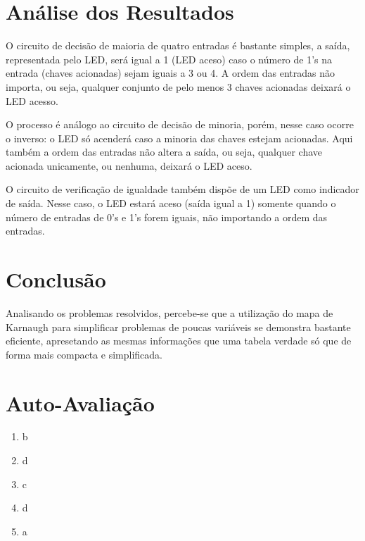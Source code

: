 \documentclass[12pt]{article}
\begin{document}
\section{Análise dos Resultados}
\label{sec:Resultados}

O circuito de decisão de maioria de quatro entradas é bastante simples, a saída, representada pelo LED, será igual a 1 (LED aceso) caso o número de 1's na entrada (chaves acionadas) sejam iguais a 3 ou 4. A ordem das entradas não importa, ou seja, qualquer conjunto de pelo menos 3 chaves acionadas deixará o LED acesso.

O processo é análogo ao circuito de decisão de minoria, porém, nesse caso ocorre o inverso: o LED só acenderá caso a minoria das chaves estejam acionadas. Aqui também a ordem das entradas não altera a saída, ou seja, qualquer chave acionada unicamente, ou nenhuma, deixará o LED aceso.

O circuito de verificação de igualdade também dispõe de um LED como indicador de saída. Nesse caso, o LED estará aceso (saída igual a 1) somente quando o número de entradas de 0's e 1's forem iguais, não importando a ordem das entradas.

\section{Conclusão}
\label{sec:Conclusao}

Analisando os problemas resolvidos, percebe-se que a utilização do mapa de Karnaugh para simplificar problemas de poucas variáveis se demonstra bastante eficiente, apresetando as mesmas informações que uma tabela verdade só que de forma mais compacta e simplificada.



\cite{tocci}
\cite{sistemas_digitais_slides}

\newpage 
\section*{Auto-Avaliação}

\begin{enumerate}
    \item b
    \item d
    \item c
    \item d
    \item a
\end{enumerate}
\end{document}
